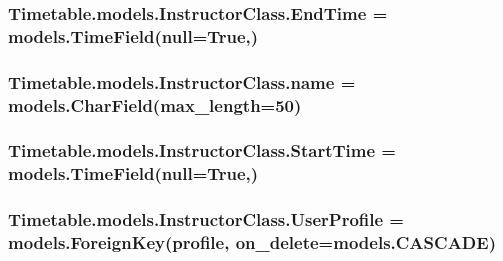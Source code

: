 \subsubsection[{\texorpdfstring{End\+Time}{EndTime}}]{\setlength{\rightskip}{0pt plus 5cm}Timetable.\+models.\+Instructor\+Class.\+End\+Time = models.\+Time\+Field(null=True,)\hspace{0.3cm}{\ttfamily [static]}}\hypertarget{classTimetable_1_1models_1_1InstructorClass_a6007f8134ba154b5ef244c98f1aa0fdf}{}\label{classTimetable_1_1models_1_1InstructorClass_a6007f8134ba154b5ef244c98f1aa0fdf}
\subsubsection[{\texorpdfstring{name}{name}}]{\setlength{\rightskip}{0pt plus 5cm}Timetable.\+models.\+Instructor\+Class.\+name = models.\+Char\+Field(max\+\_\+length=50)\hspace{0.3cm}{\ttfamily [static]}}\hypertarget{classTimetable_1_1models_1_1InstructorClass_a215826a11f8c099d0691884b0c045b8d}{}\label{classTimetable_1_1models_1_1InstructorClass_a215826a11f8c099d0691884b0c045b8d}
\subsubsection[{\texorpdfstring{Start\+Time}{StartTime}}]{\setlength{\rightskip}{0pt plus 5cm}Timetable.\+models.\+Instructor\+Class.\+Start\+Time = models.\+Time\+Field(null=True,)\hspace{0.3cm}{\ttfamily [static]}}\hypertarget{classTimetable_1_1models_1_1InstructorClass_ae84d6848e4563e2174fa59dde0349497}{}\label{classTimetable_1_1models_1_1InstructorClass_ae84d6848e4563e2174fa59dde0349497}
\subsubsection[{\texorpdfstring{User\+Profile}{UserProfile}}]{\setlength{\rightskip}{0pt plus 5cm}Timetable.\+models.\+Instructor\+Class.\+User\+Profile = models.\+Foreign\+Key({\bf profile}, on\+\_\+delete=models.\+C\+A\+S\+C\+A\+DE)\hspace{0.3cm}{\ttfamily [static]}}\hypertarget{classTimetable_1_1models_1_1InstructorClass_aa2e79111de73e0c8624aca6754ca3da4}{}\label{classTimetable_1_1models_1_1InstructorClass_aa2e79111de73e0c8624aca6754ca3da4}
